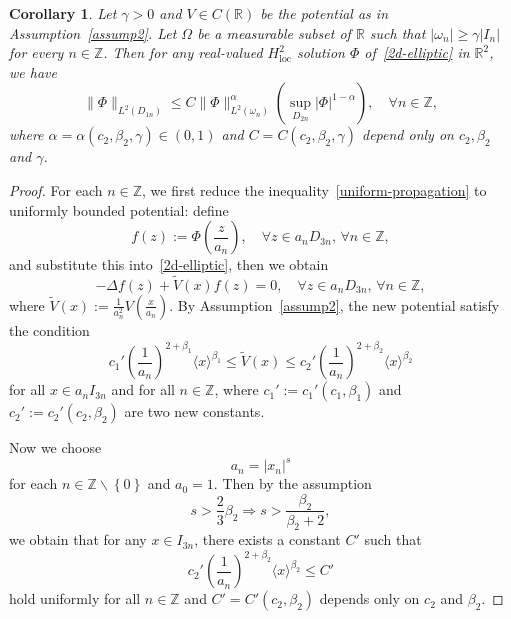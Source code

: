 \documentclass{amsart}
\newcommand\R{\ensuremath{\mathbb{R}}}
\newcommand\Z{\ensuremath{\mathbb{Z}}}
\newtheorem{corollary}[theorem]{Corollary}
\theoremstyle{definition}
\begin{document}
\begin{corollary}\label{propagation-crc}
	Let $\gamma>0$ and $V\in C(\R)$ be the potential as in Assumption~\ref{assump2}. Let $\Omega$ be a measurable subset of $\R$ such that $|\omega_n|\ge \gamma|I_{n}|$ for every $n\in \Z$. Then for any real-valued $H^2_{\mathrm{loc}}$ solution $\Phi$ of~\eqref{2d-elliptic} in $\R^2$, we have
	\begin{equation}
		\|\Phi\|_{L^2(D_{1n})}\le C\|\Phi\|^{\alpha}_{L^2(\omega_n)}\left( \sup_{D_{2n}}|\Phi|^{1-\alpha} \right),\quad \forall n\in \Z, 
	\end{equation}
	where $\alpha=\alpha(c_2,\beta_2,\gamma)\in (0,1)$ and $C=C(c_2,\beta_2,\gamma)$ depend only on $c_2,\beta_2$ and $\gamma$. 
\end{corollary}
\begin{proof}
	For each $n\in \Z$, we first reduce the inequality~\eqref{uniform-propagation} to uniformly bounded potential: define 
	\begin{equation}
		f(z):=\Phi\left( \frac{z}{a_n} \right), \quad \forall z\in a_nD_{3n},\, \forall n\in \Z,
	\end{equation}
	and substitute this into~\eqref{2d-elliptic}, then we obtain
	\begin{equation}
		-\Delta f(z)+\widetilde{V}(x)f(z)=0,\quad \forall z\in a_n D_{3n},\,\forall n\in \Z,\label{reduced-2d-elliptic}
	\end{equation}
	where $\displaystyle \widetilde{V}(x):=\frac{1}{a_n^2}V\left( \frac{x}{a_n} \right)$.
	By Assumption~\ref{assump2}, the new potential satisfy the condition
	\begin{equation}
		c_1' \left( \frac{1}{a_n} \right) ^{2+\beta_1}\langle x\rangle ^{\beta_1}\le \widetilde{V}(x)\le c_2'\left( \frac{1}{a_n} \right) ^{2+\beta_2}\langle x\rangle ^{\beta_2}
	\end{equation}
	for all $x\in a_nI_{3n}$ and for all $n\in \Z$, where $c_1':=c_1'\left( c_1,\beta_1 \right) $ and $c_2':=c_2'(c_2,\beta_2)$ are two new constants.

	Now we choose
\begin{equation}
	a_n=|x_n|^{s}
\end{equation}
for each $n\in \Z\backslash \left\{0\right\} $ and $a_0=1$.
	Then by the assumption 
\begin{equation}
	s>\frac{2}{3}\beta_2 \Longrightarrow s> \frac{\beta_2}{\beta_2+2},
\end{equation}
	we obtain that for any $x\in I_{3n}$, there exists a constant $C'$ such that
	\begin{equation}
		c_2'\left( \frac{1}{a_n} \right) ^{2+\beta_2}\langle x\rangle ^{\beta_2}\le C'
	\end{equation}
	hold uniformly for all $n\in \Z$ and $C'=C'(c_2,\beta_2)$ depends only on $c_2$ and $\beta_2$.


\end{proof}
\end{document}
